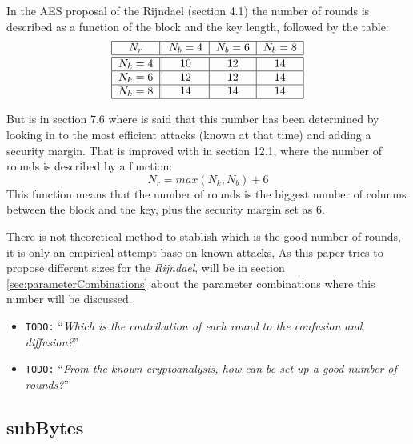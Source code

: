 \documentclass[10pt,a4paper,twoside]{llncs}
\newcommand{\todo}[1]{\texttt{\color{red}TODO:} ``\emph{#1}''}
\newcommand{\rijndael}{\emph{Rijndael}}
\begin{document}
In the AES proposal of the Rijndael \cite{Daemen01aes-ammended} (section 4.1) the number of rounds is described as a function of the block and the key length, followed by the table:
\begin{equation}\label{tab:nrounds}
\begin{tabular}{|c||c|c|c|}
\hline
$N_r$     & $N_b = 4$ & $N_b = 6$ & $N_b = 8$ \\ \hline\hline
$N_k = 4$ &    $10$   &    $12$   &    $14$   \\ \hline
$N_k = 6$ &    $12$   &    $12$   &    $14$   \\ \hline
$N_k = 8$ &    $14$   &    $14$   &    $14$   \\ \hline
\end{tabular}
\end{equation}

 But is in section 7.6 where is said that this number has been determined by looking in to the most efficient attacks (known at that time) and adding a security margin. That is improved with in section 12.1, where the number of rounds is described by a function:
\begin{equation}\label{eq:nrounds}
 N_r = max(N_k,N_b)+6
\end{equation}
This function means that the number of rounds is the biggest number of columns between the block and the key, plus the security margin set as $6$.

There is not theoretical method to stablish which is the good number of rounds, it is only an empirical attempt base on known attacks, As this paper tries to propose different sizes for the \rijndael, will be in section \ref{sec:parameterCombinations} about the parameter combinations where this number will be discussed.

\begin{itemize}
    \item \todo{Which is the contribution of each round to the confusion and diffusion?}
    \item \todo{From the known cryptoanalysis, how can be set up a good number of rounds?}
\end{itemize}


\subsection{subBytes}\label{sec:subBytes}
\end{document}
